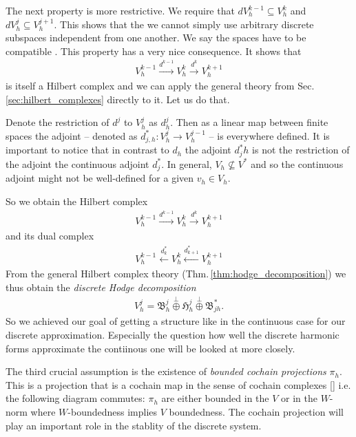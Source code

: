 \documentclass[../master_thesis.tex]{subfiles}
\begin{document}
The next property is more restrictive. We require that $dV_h^{k-1} \subseteq V_h^k$ 
and $dV_h^j \subseteq V_h^{j+1}$. This shows that the we cannot simply use arbitrary 
discrete subspaces independent from one another. We say the spaces have to be 
compatible \cite{}. This property has a very nice
consequence. 
It shows that 
\begin{align*}
    V_h^{k-1} \xrightarrow{d^{k-1}} V_h^k \xrightarrow{d^k} V_h^{k+1}
\end{align*}
is itself a Hilbert complex and we can apply the general theory from 
Sec. \ref{sec:hilbert_complexes} directly to it. Let us do that.

Denote the restriction of $d^j$ to $V_h^j$ as $d_h^j$. Then as a linear map 
between finite spaces the adjoint -- denoted as $d_{j,h}^*: V_h^j \rightarrow V_h^{j-1}$ -- 
is everywhere defined. It is important to notice that in contrast to $d_h$ 
the adjoint $d^*_jh$ is not the restriction of the adjoint the continuous adjoint $d^*_j$.
In general, $V_h \not\subseteq V^*$ and so the continuous adjoint might not be 
well-defined for a given $v_h \in V_h$. 

So we obtain the Hilbert complex
\begin{align*}
    V_h^{k-1} \xrightarrow{d^{k-1}} V_h^{k} \xrightarrow{d^{k}} V_h^{k+1}
\end{align*}
and its dual complex
\begin{align*}
    V_h^{k-1} \xleftarrow{d^*_k} V_h^{k} \xleftarrow{d^*_{k+1}} V_h^{k+1}
\end{align*}
From the general Hilbert complex theory (Thm.\,\ref{thm:hodge_decomposition})
we thus obtain the \textit{discrete Hodge decomposition}
\begin{align*}
    V_h^j = \mathfrak{B}^j_h \stackrel{\perp}{\oplus} \mathfrak{H}^j_h \stackrel{\perp}{\oplus}
        \mathfrak{B}^*_{jh}.
\end{align*}
So we achieved our goal of getting a structure like in the continuous case 
for our discrete approximation. Especially the question how well the discrete harmonic 
forms approximate the contiinous one will be looked at more closely.


The third crucial assumption is the existence of \textit{bounded cochain projections} $\pi_h$. 
This is a projection that is a cochain map in the sense of cochain complexes \ref{} i.e. 
the following diagram commutes:
$\pi_h$ are either bounded in the $V$ or in the $W$-norm where  
$W$-boundedness implies $V$ boundedness. 
The cochain projection will play an important 
role in the stablity of the discrete system.
\end{document}
